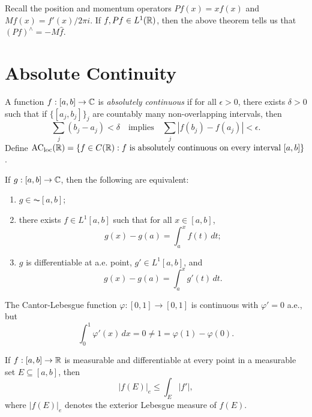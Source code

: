 \begin{remark}
  Recall the  position and momentum
  operators $Pf(x) = x f(x)$ and
  $M f(x) = f'(x) / 2\pi i$. If
  $f, Pf \in L^1(\mathbb{R})$, then the above
  theorem tells us that
  $(Pf)^\wedge = -M \widehat{f}$.
\end{remark}

\section{Absolute Continuity}

\begin{definition}
  A function $f : [a, b] \to \mathbb{C}$ is
  \emph{absolutely continuous} if
  for all $\epsilon > 0$, there exists
  $\delta > 0$ such that if
  $\{[a_j, b_j]\}_{j}$ are countably many
  non-overlapping intervals, then
  \[
    \sum_j (b_j - a_j) < \delta
    \quad \text{implies} \quad
    \sum_j |f(b_j) - f(a_j)| < \epsilon.
  \]
  Define $\mathrm{AC}_{\mathrm{loc}}(\mathbb{R}) = \{f \in C(\mathbb{R}) : f \text{ is absolutely continuous on every interval } [a, b]\}$.
\end{definition}

\begin{theorem}
  If $g : [a, b] \to \mathbb{C}$, then
  the following are equivalent:
  \begin{enumerate}
    \item $g \in \AC[a, b]$;
    \item there exists $f \in L^1[a, b]$
      such that for all $x \in [a, b]$,
      \[
        g(x) - g(a)
        = \int_a^x f(t) \, dt;
      \]
    \item $g$ is differentiable at a.e.
      point, $g' \in L^1[a, b]$, and
      \[
        g(x) - g(a)
        = \int_a^x g'(t) \, dt.
      \]
  \end{enumerate}
\end{theorem}

\begin{remark}
  The Cantor-Lebesgue function
  $\varphi : [0, 1] \to [0, 1]$ is continuous
  with $\varphi' = 0$ a.e., but
  \[
    \int_0^1 \varphi'(x) \, dx = 0
    \ne 1 = \varphi(1) - \varphi(0).
  \]
\end{remark}

\begin{lemma}
  If $f : [a, b] \to \mathbb{R}$ is measurable and
  differentiable at every point in
  a measurable set $E \subseteq [a, b]$,
  then
  \[
    |f(E)|_e \le \int_E |f'|,
  \]
  where $|f(E)|_e$ denotes the
  exterior Lebesgue measure of $f(E)$.
\end{lemma}

